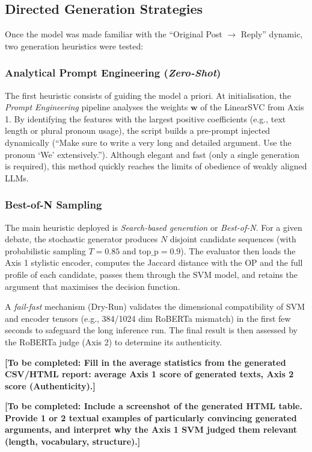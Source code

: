 \documentclass[11pt,a4paper]{article}
\begin{document}
\subsection{Directed Generation Strategies}
Once the model was made familiar with the ``Original Post $\rightarrow$ Reply''
dynamic, two generation heuristics were tested:

\subsubsection{Analytical Prompt Engineering (\textit{Zero-Shot})}
The first heuristic consists of guiding the model a priori. At initialisation,
the \textit{Prompt Engineering} pipeline analyses the weights $\mathbf{w}$ of
the LinearSVC from Axis 1. By identifying the features with the largest
positive coefficients (e.g., text length or plural pronoun usage), the script
builds a pre-prompt injected dynamically (``Make sure to write a very long and
detailed argument. Use the pronoun `We' extensively.''). Although elegant and
fast (only a single generation is required), this method quickly reaches the
limits of obedience of weakly aligned LLMs.

\subsubsection{Best-of-N Sampling}
The main heuristic deployed is \textit{Search-based generation} or
\textit{Best-of-N}. For a given debate, the stochastic generator produces $N$
disjoint candidate sequences (with probabilistic sampling $T=0.85$ and
$\text{top\_p}=0.9$).
The evaluator then loads the Axis 1 stylistic encoder, computes the Jaccard
distance with the OP and the full profile of each candidate, passes them through
the SVM model, and retains the argument that maximises the decision function.

A \textit{fail-fast} mechanism (Dry-Run) validates the dimensional compatibility
of SVM and encoder tensors (e.g., 384/1024 dim RoBERTa mismatch) in the first
few seconds to safeguard the long inference run. The final result is then
assessed by the RoBERTa judge (Axis 2) to determine its authenticity.

\vspace{0.5cm}
\begin{tcolorbox}[colback=blue!5!white,colframe=blue!75!black,title=Axis 3 Experimental Results]
\textbf{[To be completed: Fill in the average statistics from the generated CSV/HTML report: average Axis 1 score of generated texts, Axis 2 score (Authenticity).]}

\textbf{[To be completed: Include a screenshot of the generated HTML table. Provide 1 or 2 textual examples of particularly convincing generated arguments, and interpret why the Axis 1 SVM judged them relevant (length, vocabulary, structure).]}
\end{tcolorbox}
\end{document}

